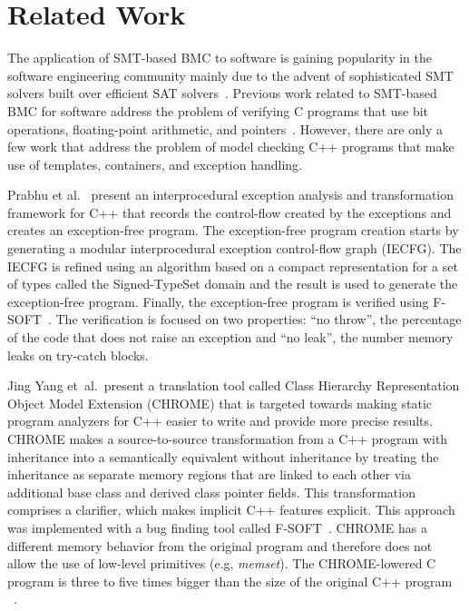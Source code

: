 \documentclass[a4paper]{llncs}
\begin{document}
\section{Related Work}

The application of SMT-based BMC to software is gaining
popularity in the software engineering community mainly due
to the advent of sophisticated SMT solvers built over efficient
SAT solvers~\cite{CVC07,Boolector09,Z08}. Previous work related to
SMT-based BMC for software address the problem of verifying C programs
that use bit operations, floating-point arithmetic, and
pointers~\cite{Clarke04,Armando09,Ganai06,Cordeiro12}.
However, there are only a few work that address the problem
of model checking C++ programs that make use of templates, containers,
and exception handling.

Prabhu et al.~\cite{PrabhuMBIG11} present an interprocedural
exception analysis and transformation framework for C++ that
records the control-flow created by the exceptions
and creates an exception-free program. The exception-free
program creation starts by generating a modular interprocedural
exception control-flow graph (IECFG). The IECFG is refined using
an algorithm based on a compact representation for a set of types
called the Signed-TypeSet domain and the result is used
to generate the exception-free program. Finally, the exception-free
program is verified using F-SOFT~\cite{Fsoft}. The verification is
focused on two properties: ``no throw'', the percentage of the code
that does not raise an exception and ``no leak'', the number memory
leaks on try-catch blocks.~\cite{PrabhuMBIG11}

Jing Yang et~al.\ present a translation tool called Class Hierarchy
Representation Object Model Extension (CHROME) that is targeted towards
making static program analyzers for C++ easier to write and provide
more precise results. CHROME makes a source-to-source transformation
from a C++ program with inheritance into a semantically equivalent without
inheritance by treating the inheritance as separate memory regions
that are linked to each other via additional base class and derived class
pointer fields. This transformation comprises a clarifier, which makes
implicit C++ features explicit. This approach was implemented with a bug
finding tool called F-SOFT~\cite{Fsoft}. CHROME has a
different memory behavior from the original program and therefore does not allow
the use of low-level primitives (e.g, \textit{memset}). The CHROME-lowered C program is
three to five times bigger than the size of the original C++ program ~\cite{Yang12}.
\end{document}
